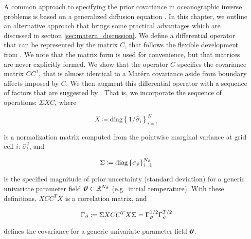 A common approach to specifying the prior covariance in oceanographic inverse
problems is based on a generalized
diffusion equation \citep{weaver_correlation_2001}.
In this chapter, we outline an alternative approach that brings some practical
advantages which are discussed in section \ref{sec:matern_discussion}.
We define a differential operator that can be represented by the matrix $C$,
that follows the flexible development from \citet{RSSB:RSSB777}.
We note that the matrix form is used for convenience, but that matrices are
never explicitly formed.
We show that the operator $C$ specifies the covariance matrix $CC^T$, that
is almost identical to a Mat\'ern covariance aside from boundary affects
imposed by $C$.
We then augment this differential operator with a sequence of factors that
are suggested by \citet{weaver_correlation_2001}.
That is, we incorporate the sequence of operations:
$\Sigma X C $, where
\begin{linenomath*}\begin{equation*}
    X \coloneqq \text{diag}\left\{ 1/\hat{\sigma}_{i}\right\}_{i=1}^{N}
\end{equation*}\end{linenomath*}
is a
normalization matrix computed from the pointwise marginal variance at grid cell
$i$: $\hat{\sigma}^2_{i}$, and
\begin{linenomath*}\begin{equation*}
    \Sigma \coloneqq \text{diag}\left\{\sigma_{\vartheta}\right\}_{i=1}^{N_{\vartheta}}
\end{equation*}\end{linenomath*}
is the specified magnitude of prior uncertainty (standard deviation) for a
generic univariate parameter field $\bm{\vartheta}\in\mathbb{R}^{N_{\vartheta}}$ (e.g.\ initial temperature).
With these definitions, $XCC^TX$ is a correlation matrix, and
\begin{linenomath}\begin{equation}
    \Gamma_{\vartheta} \coloneqq \Sigma X C C^T X \Sigma =
    \Gamma_{\vartheta}^{1/2}\Gamma_{\vartheta}^{T/2}
\end{equation}\end{linenomath}
defines the covariance for a generic univariate parameter field $\bm{\vartheta}$.

